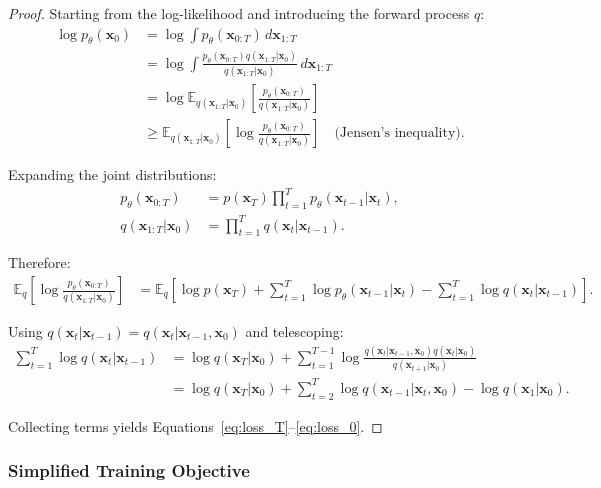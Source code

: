 \documentclass[12pt]{report}
\theoremstyle{definition}
\newcommand{\E}{\mathbb{E}}
\begin{document}
\begin{proof}
Starting from the log-likelihood and introducing the forward process $q$:
\begin{align*}
\log p_\theta(\mathbf{x}_0) &= \log \int p_\theta(\mathbf{x}_{0:T}) \, d\mathbf{x}_{1:T} \\
&= \log \int \frac{p_\theta(\mathbf{x}_{0:T}) q(\mathbf{x}_{1:T}|\mathbf{x}_0)}{q(\mathbf{x}_{1:T}|\mathbf{x}_0)} \, d\mathbf{x}_{1:T} \\
&= \log \E_{q(\mathbf{x}_{1:T}|\mathbf{x}_0)}\left[\frac{p_\theta(\mathbf{x}_{0:T})}{q(\mathbf{x}_{1:T}|\mathbf{x}_0)}\right] \\
&\geq \E_{q(\mathbf{x}_{1:T}|\mathbf{x}_0)}\left[\log \frac{p_\theta(\mathbf{x}_{0:T})}{q(\mathbf{x}_{1:T}|\mathbf{x}_0)}\right] \quad \text{(Jensen's inequality)}.
\end{align*}

Expanding the joint distributions:
\begin{align*}
p_\theta(\mathbf{x}_{0:T}) &= p(\mathbf{x}_T) \prod_{t=1}^T p_\theta(\mathbf{x}_{t-1}|\mathbf{x}_t), \\
q(\mathbf{x}_{1:T}|\mathbf{x}_0) &= \prod_{t=1}^T q(\mathbf{x}_t|\mathbf{x}_{t-1}).
\end{align*}

Therefore:
\begin{align*}
\E_q\left[\log \frac{p_\theta(\mathbf{x}_{0:T})}{q(\mathbf{x}_{1:T}|\mathbf{x}_0)}\right] &= \E_q\left[\log p(\mathbf{x}_T) + \sum_{t=1}^T \log p_\theta(\mathbf{x}_{t-1}|\mathbf{x}_t) - \sum_{t=1}^T \log q(\mathbf{x}_t|\mathbf{x}_{t-1})\right].
\end{align*}

Using $q(\mathbf{x}_t|\mathbf{x}_{t-1}) = q(\mathbf{x}_t|\mathbf{x}_{t-1}, \mathbf{x}_0)$ and telescoping:
\begin{align*}
\sum_{t=1}^T \log q(\mathbf{x}_t|\mathbf{x}_{t-1}) &= \log q(\mathbf{x}_T|\mathbf{x}_0) + \sum_{t=1}^{T-1} \log \frac{q(\mathbf{x}_t|\mathbf{x}_{t-1}, \mathbf{x}_0) q(\mathbf{x}_t|\mathbf{x}_0)}{q(\mathbf{x}_{t+1}|\mathbf{x}_0)} \\
&= \log q(\mathbf{x}_T|\mathbf{x}_0) + \sum_{t=2}^T \log q(\mathbf{x}_{t-1}|\mathbf{x}_t, \mathbf{x}_0) - \log q(\mathbf{x}_1|\mathbf{x}_0).
\end{align*}

Collecting terms yields Equations~\eqref{eq:loss_T}--\eqref{eq:loss_0}.
\end{proof}

\subsubsection{Simplified Training Objective}
\end{document}
